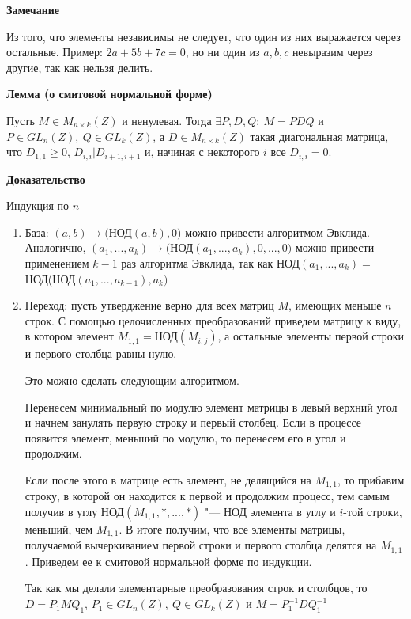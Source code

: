 \documentclass{article}
\begin{document}
\textbf{Замечание}

Из того, что элементы независимы не следует, что один из них выражается через остальные. Пример: $2a + 5b + 7c = 0$, но ни один из $a, b, c$ невыразим через другие, так как нельзя делить.

\vspace{10pt}

\textbf{Лемма (о смитовой нормальной форме)}

Пусть $M \in M_{n \times k}(Z)$ и ненулевая. Тогда $\exists P, D, Q: \ M = PDQ$ и $P \in GL_n(Z), \ Q \in GL_k(Z)$, а $D \in M_{n \times k}(Z)$ такая диагональная матрица, что $D_{1,1} \geq 0$, $D_{i,i} | D_{i+1,i+1}$ и, начиная с некоторого $i$ все $D_{i,i} = 0$.

\textbf{Доказательство}

Индукция по $n$
\begin{enumerate}
	\item База: $(a, b) \rightarrow ($НОД$(a, b), 0)$ можно привести алгоритмом Эвклида. Аналогично, $(a_1, ..., a_k) \rightarrow ($НОД$(a_1, ..., a_k), 0, ..., 0)$ можно привести применением $k-1$ раз алгоритма Эвклида, так как НОД$(a_1, ..., a_k) = $НОД(НОД$(a_1, ..., a_{k-1}), a_k)$
	\item Переход: пусть утверджение верно для всех матриц $M$, имеющих меньше $n$ строк. С помощью целочисленных преобразований приведем матрицу к виду, в котором элемент $M_{1,1} = $НОД$(M_{i, j})$, а остальные элементы первой строки и первого столбца равны нулю.
	
	Это можно сделать следующим алгоритмом.
	
	Перенесем минимальный по модулю элемент матрицы в левый верхний угол и начнем занулять первую строку и первый столбец. Если в процессе появится элемент, меньший по модулю, то перенесем его в угол и продолжим.
	
	Если после этого в матрице есть элемент, не делящийся на $M_{1,1}$, то прибавим строку, в которой он находится к первой и продолжим процесс, тем самым получив в углу НОД$(M_{1,1}, *, ..., *)$ "--- НОД элемента в углу и $i$-той строки, меньший, чем $M_{1,1}$. В итоге получим, что все элементы матрицы, получаемой вычеркиванием первой строки и первого столбца делятся на $M_{1,1}$. Приведем ее к смитовой нормальной форме по индукции. 
	
	Так как мы делали элементарные преобразования строк и столбцов, то $D = P_1MQ_1$, $P_1 \in GL_n(Z), \ Q \in GL_k(Z)$ и $M = P_1^{-1}DQ_1^{-1}$
\end{enumerate}
\end{document}
